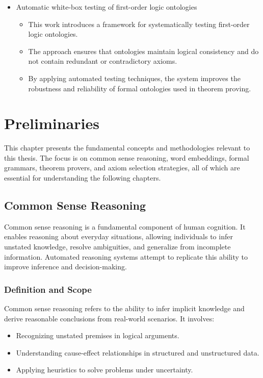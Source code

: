 \documentclass[english,version-2020-11]{uzl-thesis}
\begin{document}
\begin{itemize}
    \item Automatic white-box testing of first-order logic ontologies \cite{Alvez2017}
    \begin{itemize}
        \item This work introduces a framework for systematically testing first-order logic ontologies.
        \item The approach ensures that ontologies maintain logical consistency and do not contain redundant or contradictory axioms.
        \item By applying automated testing techniques, the system improves the robustness and reliability of formal ontologies used in theorem proving.
    \end{itemize}
\end{itemize}

%

\chapter{Preliminaries}
\label{chapter-preliminaries}

This chapter presents the fundamental concepts and methodologies relevant to this thesis. The focus is on common sense reasoning, word embeddings, formal grammars, theorem provers, and axiom selection strategies, all of which are essential for understanding the following chapters.

\section{Common Sense Reasoning}

Common sense reasoning is a fundamental component of human cognition. It enables reasoning about everyday situations, allowing individuals to infer unstated knowledge, resolve ambiguities, and generalize from incomplete information. Automated reasoning systems attempt to replicate this ability to improve inference and decision-making.

\subsection{Definition and Scope}
Common sense reasoning refers to the ability to infer implicit knowledge and derive reasonable conclusions from real-world scenarios. It involves:
\begin{itemize}
    \item Recognizing unstated premises in logical arguments.
    \item Understanding cause-effect relationships in structured and unstructured data.
    \item Applying heuristics to solve problems under uncertainty.
\end{itemize}
\end{document}
